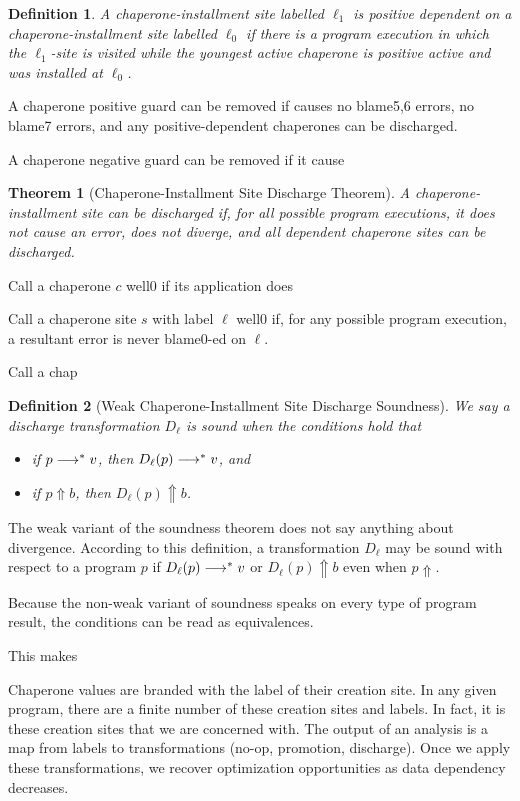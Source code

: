 \documentclass{sigplanconf}
\newtheorem{definition}{Definition}
\newtheorem{theorem}{Theorem}
\begin{document}
\begin{definition}
A chaperone-installment site labelled $\ell_1$ is \emph{positive dependent} on a chaperone-installment site labelled $\ell_0$ if there is a program execution in which the $\ell_1$-site is visited while the youngest active chaperone is positive active and was installed at $\ell_0$.
\end{definition}

A chaperone positive guard can be removed if causes no blame5,6 errors, no blame7 errors, and any positive-dependent chaperones can be discharged.

A chaperone negative guard can be removed if it cause

\begin{theorem}[Chaperone-Installment Site Discharge Theorem]
A chaperone-installment site can be discharged if, for all possible program executions, it does not cause an error, does not diverge, and all dependent chaperone sites can be discharged.
\end{theorem}

Call a chaperone $c$ well0 if its application does

Call a chaperone site $s$ with label $\ell$ well0 if, for any possible program execution, a resultant error is never blame0-ed on $\ell$.

Call a chap



\begin{definition}[Weak Chaperone-Installment Site Discharge Soundness]
We say a discharge transformation $D_\ell$ is sound when the conditions hold that
\begin{itemize}
\item if $p\longrightarrow^{*} v$, then $D_\ell(p)\longrightarrow^{*} v$, and
\item if $p\Uparrow b$, then $D_\ell(p)\Uparrow b$.
\end{itemize}
\end{definition}

The weak variant of the soundness theorem does not say anything about divergence. According to this definition, a transformation $D_\ell$ may be sound with respect to a program $p$ if $D_\ell(p)\longrightarrow^{*} v$ or $D_\ell(p)\Uparrow b$ even when $p\Uparrow$.

Because the non-weak variant of soundness speaks on every type of program result, the conditions can be read as equivalences.

This makes 

Chaperone values are branded with the label of their creation site. In any given program, there are a finite number of these creation sites and labels. In fact, it is these creation sites that we are concerned with. The output of an analysis is a map from labels to transformations (no-op, promotion, discharge). Once we apply these transformations, we recover optimization opportunities as data dependency decreases.
\end{document}
